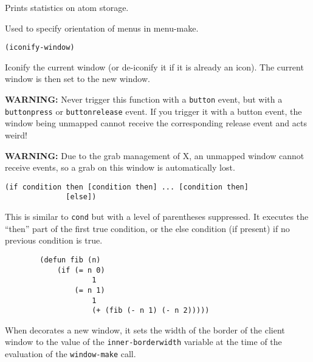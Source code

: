 Prints statistics on atom storage.

        

Used to specify orientation of menus in menu-make.

        
{\usagefont\begin{verbatim}
(iconify-window)
\end{verbatim}}\usageupspace

Iconify the current window (or de-iconify it if it is already an icon). The
current window is then set to the new window. 

{\bf WARNING:} Never trigger this function with a \verb"button" event, but
with a \verb"buttonpress" or \verb"buttonrelease" event. If you trigger it
with a button event, the window being unmapped cannot receive the
corresponding release event and {\GWM} acts weird!

{\bf WARNING:} Due to the grab management of X, an unmapped window cannot
receive events, so a grab on this window is automatically lost.

        
{\usagefont\begin{verbatim}
(if condition then [condition then] ... [condition then]
              [else])
\end{verbatim}}\usageupspace

This is similar to \verb"cond" but with a level of parentheses suppressed.  It
executes the ``then'' part of the first true condition, or the else condition
(if present) if no previous condition is true.

{\exemplefont\begin{verbatim}
        (defun fib (n)
            (if (= n 0)
                    1
                (= n 1) 
                    1
                    (+ (fib (- n 1) (- n 2)))))
\end{verbatim}}

        

When {\GWM} decorates a new window, it sets the width of the border of the
client window to the value of the \verb"inner-borderwidth" variable at the
time of the evaluation of the \verb"window-make" call.

